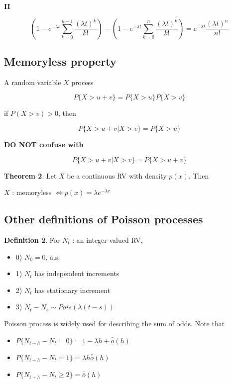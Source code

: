 \documentclass[12pt]{article}
\theoremstyle{nonumberbreak}
\begin{document}
\textbf{II}

$$
(1 - e^{-\lambda t} \sum_{k=0}^{n-1} \frac{(\lambda t)^k}{k!}) - (1 - e^{-\lambda t} \sum_{k=0}^n \frac{(\lambda t)^k}{k!}) = e^{-\lambda t} \frac{(\lambda t)^n}{n!}
$$



\subsection{Memoryless property}


A random variable $X$ process 

$$
P \{ X > u + v \} = P \{ X > u  \} P \{ X > v \}
$$

if $P (X > v) > 0$, then

$$
P \{ X > u + v  | X > v\} = P\{ X > u\}
$$


\textbf{DO NOT confuse with}

$$
P \{ X > u + v  | X > v\} = P\{ X > u + v\}
$$


\begin{theorem}
\textbf{Theorem 2}. Let $X$ be a continuous RV with density $p(x)$. Then

\begin{center}
$X$ : memoryless $\Leftrightarrow p(x) = \lambda e^{-\lambda x}$
\end{center}

\end{theorem}



\subsection{Other definitions of Poisson processes}


\begin{theorem}
\textbf{Definition 2}. For $N_t$ : an integer-valued RV,

\begin{itemize}
	\item 0) $N_0 = 0$, a.s.
	\item 1) $N_t$ has independent increments 
	\item 2) $N_t$ has stationary increment 
	\item 3) $N_t - N_s \sim Pois (\lambda (t-s))$
\end{itemize}
\end{theorem}


Poisson process is widely used for describing the sum of odds. Note that


\begin{theorem}
\begin{itemize}
	\item $P\{ N_{t+h} - N_t = 0 \} = 1 - \lambda h + \bar{\bar{o}}(h)$
	\item $P\{ N_{t+h} - N_t = 1 \} = \lambda h \bar{\bar{o}}(h)$
	\item $P\{ N_{t+h} - N_t \ge 2 \} = \bar{\bar{o}}(h)$
\end{itemize}
\end{theorem}
\end{document}
